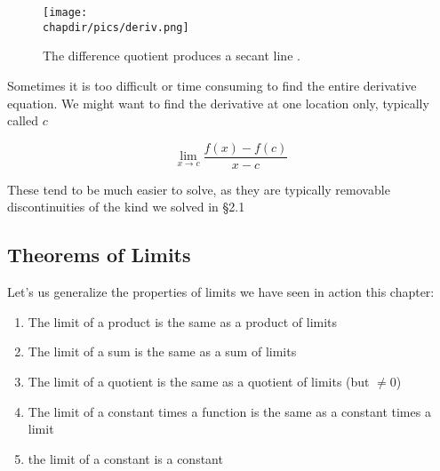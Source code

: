 \begin{figure}
\begin{center}
\texttt{[image: \\chapdir/pics/deriv.png]}
\caption{The difference quotient produces a secant line \cite{derivativedefinition}.}
\end{center}
\end{figure}

Sometimes it is too difficult or time consuming to find the entire derivative equation.
We might want to find the derivative at one location only, typically called $c$

\begin{equation}
\lim_{x\rightarrow c}\frac{f(x)-f(c)}{x-c}
\end{equation}

These tend to be much easier to solve, as they are typically removable discontinuities
of the kind we solved in §2.1

\subsection{Theorems of Limits}
Let's us generalize the properties of limits we have seen in action this chapter:
\begin{enumerate}
\item The limit of a product is the same as a product of limits
\item The limit of a sum is the same as a sum of limits
\item The limit of a quotient is the same as a quotient of limits (but $\ne 0$)
\item The limit of a constant times a function is the same as a constant times a limit
\item the limit of a constant is a constant
\end{enumerate}
